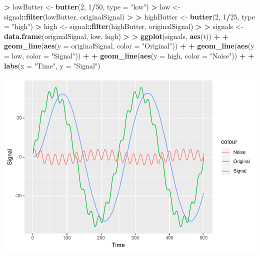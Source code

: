 \documentclass[
]{krantz}
\makeatletter
\newenvironment{Shaded}{\begin{snugshade}}{\end{snugshade}}
\newcommand{\DataTypeTok}[1]{\textcolor[rgb]{0.27,0.27,0.27}{#1}}
\newcommand{\DecValTok}[1]{\textcolor[rgb]{0.06,0.06,0.06}{#1}}
\newcommand{\ErrorTok}[1]{\textcolor[rgb]{0.14,0.14,0.14}{\textbf{#1}}}
\newcommand{\KeywordTok}[1]{\textcolor[rgb]{0.27,0.27,0.27}{\textbf{#1}}}
\newcommand{\NormalTok}[1]{#1}
\newcommand{\OperatorTok}[1]{\textcolor[rgb]{0.43,0.43,0.43}{\textbf{#1}}}
\newcommand{\StringTok}[1]{\textcolor[rgb]{0.5,0.5,0.5}{#1}}
\newenvironment{kframe}{%
\medskip{}
\setlength{\fboxsep}{.8em}
 \def\at@end@of@kframe{}%
 \ifinner\ifhmode%
  \def\at@end@of@kframe{\end{minipage}}%
  \begin{minipage}{\columnwidth}%
 \fi\fi%
 \def\FrameCommand##1{\hskip\@totalleftmargin \hskip-\fboxsep
 \colorbox{shadecolor}{##1}\hskip-\fboxsep
     \hskip-\linewidth \hskip-\@totalleftmargin \hskip\columnwidth}%
 \MakeFramed {\advance\hsize-\width
   \@totalleftmargin\z@ \linewidth\hsize
   \@setminipage}}%
 {\par\unskip\endMakeFramed%
 \at@end@of@kframe}
\renewenvironment{Shaded}{\begin{kframe}}{\end{kframe}}
\makeatother
\begin{document}
\begin{Shaded}
\begin{Highlighting}[]
\OperatorTok{\textgreater{}}\StringTok{ }\NormalTok{lowButter \textless{}{-}}\StringTok{ }\KeywordTok{butter}\NormalTok{(}\DecValTok{2}\NormalTok{, }\DecValTok{1}\OperatorTok{/}\DecValTok{50}\NormalTok{, }\DataTypeTok{type =} \StringTok{"low"}\NormalTok{)}
\OperatorTok{\textgreater{}}\StringTok{ }\NormalTok{low \textless{}{-}}\StringTok{ }\NormalTok{signal}\OperatorTok{::}\KeywordTok{filter}\NormalTok{(lowButter, originalSignal)}
\OperatorTok{\textgreater{}}\StringTok{ }
\ErrorTok{\textgreater{}}\StringTok{ }\NormalTok{highButter \textless{}{-}}\StringTok{ }\KeywordTok{butter}\NormalTok{(}\DecValTok{2}\NormalTok{, }\DecValTok{1}\OperatorTok{/}\DecValTok{25}\NormalTok{, }\DataTypeTok{type =} \StringTok{"high"}\NormalTok{)}
\OperatorTok{\textgreater{}}\StringTok{ }\NormalTok{high \textless{}{-}}\StringTok{ }\NormalTok{signal}\OperatorTok{::}\KeywordTok{filter}\NormalTok{(highButter, originalSignal)}
\OperatorTok{\textgreater{}}\StringTok{ }
\ErrorTok{\textgreater{}}\StringTok{ }\NormalTok{signals \textless{}{-}}\StringTok{ }\KeywordTok{data.frame}\NormalTok{(originalSignal, low, high)}
\OperatorTok{\textgreater{}}\StringTok{ }
\ErrorTok{\textgreater{}}\StringTok{ }\KeywordTok{ggplot}\NormalTok{(signals, }\KeywordTok{aes}\NormalTok{(t)) }\OperatorTok{+}\StringTok{ }
\OperatorTok{+}\StringTok{   }\KeywordTok{geom\_line}\NormalTok{(}\KeywordTok{aes}\NormalTok{(}\DataTypeTok{y =}\NormalTok{ originalSignal, }\DataTypeTok{color =} \StringTok{"Original"}\NormalTok{)) }\OperatorTok{+}\StringTok{ }
\OperatorTok{+}\StringTok{   }\KeywordTok{geom\_line}\NormalTok{(}\KeywordTok{aes}\NormalTok{(}\DataTypeTok{y =}\NormalTok{ low, }\DataTypeTok{color =} \StringTok{"Signal"}\NormalTok{)) }\OperatorTok{+}\StringTok{ }
\OperatorTok{+}\StringTok{   }\KeywordTok{geom\_line}\NormalTok{(}\KeywordTok{aes}\NormalTok{(}\DataTypeTok{y =}\NormalTok{ high, }\DataTypeTok{color =} \StringTok{"Noise"}\NormalTok{)) }\OperatorTok{+}\StringTok{ }
\OperatorTok{+}\StringTok{   }\KeywordTok{labs}\NormalTok{(}\DataTypeTok{x =} \StringTok{"Time"}\NormalTok{, }\DataTypeTok{y =} \StringTok{"Signal"}\NormalTok{)}
\end{Highlighting}
\end{Shaded}

\includegraphics{bookdown_files/figure-latex/unnamed-chunk-329-1.pdf}
\end{document}
